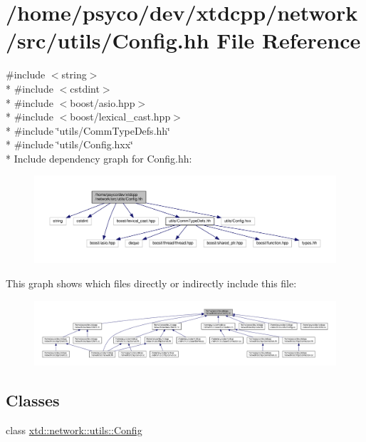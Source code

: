 \hypertarget{Config_8hh}{}\section{/home/psyco/dev/xtdcpp/network/src/utils/\+Config.hh File Reference}
\label{Config_8hh}
{\ttfamily \#include $<$string$>$}\\*
{\ttfamily \#include $<$cstdint$>$}\\*
{\ttfamily \#include $<$boost/asio.\+hpp$>$}\\*
{\ttfamily \#include $<$boost/lexical\+\_\+cast.\+hpp$>$}\\*
{\ttfamily \#include \char`\"{}utils/\+Comm\+Type\+Defs.\+hh\char`\"{}}\\*
{\ttfamily \#include \char`\"{}utils/\+Config.\+hxx\char`\"{}}\\*
Include dependency graph for Config.\+hh\+:
\nopagebreak
\begin{figure}[H]
\begin{center}
\leavevmode
\includegraphics[width=350pt]{Config_8hh__incl}
\end{center}
\end{figure}
This graph shows which files directly or indirectly include this file\+:
\nopagebreak
\begin{figure}[H]
\begin{center}
\leavevmode
\includegraphics[width=350pt]{Config_8hh__dep__incl}
\end{center}
\end{figure}
\subsection*{Classes}
\begin{DoxyCompactItemize}
\item 
class \hyperlink{classxtd_1_1network_1_1utils_1_1Config}{xtd\+::network\+::utils\+::\+Config}
\end{DoxyCompactItemize}
